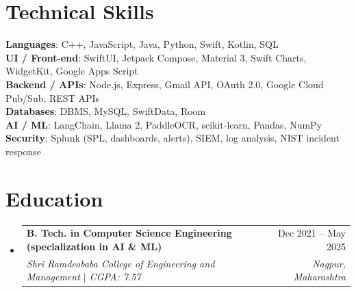 \documentclass[a4paper,11pt]{article}
\makeatletter
\newcommand{\resumeSubheading}[4]{
  \vspace{-1pt}\item
    \begin{tabularx}{0.97\textwidth}[t]{@{}>{\raggedright\arraybackslash}X@{\hspace{0.75em}}r@{}}
      \textbf{#1} & #2 \\
      \textit{\small#3} & \textit{\small #4} \\
    \end{tabularx}\vspace{-3pt}
}
\newcommand{\resumeSubItemListStart}{\begin{itemize}[leftmargin=0.15in, label={}]}
\newcommand{\resumeSubItemListEnd}{\end{itemize}}
\makeatother
\begin{document}
\section{Technical Skills}
  \begin{itemize}[leftmargin=0.15in, label={}]
    \small{\item{
      \textbf{Languages}{: C++, JavaScript, Java, Python, Swift, Kotlin, SQL} \\
      \textbf{UI / Front-end}{: SwiftUI, Jetpack Compose, Material 3, Swift Charts, WidgetKit, Google Apps Script} \\
      \textbf{Backend / APIs}{: Node.js, Express, Gmail API, OAuth 2.0, Google Cloud Pub/Sub, REST APIs} \\
      \textbf{Databases}{: DBMS, MySQL, SwiftData, Room} \\
      \textbf{AI / ML}{: LangChain, Llama 2, PaddleOCR, scikit-learn, Pandas, NumPy} \\
      \textbf{Security}{: Splunk (SPL, dashboards, alerts), SIEM, log analysis, NIST incident response}
    }}
  \end{itemize}

\section{Education}
  \resumeSubItemListStart
    \resumeSubheading
      {B. Tech. in Computer Science Engineering (specialization in AI \& ML)}{Dec 2021 -- May 2025}
      {Shri Ramdeobaba College of Engineering and Management $|$ CGPA: 7.57}{Nagpur, Maharashtra}
  \resumeSubItemListEnd
\end{document}

